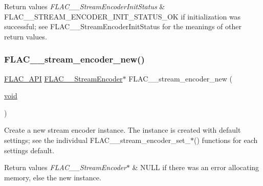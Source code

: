 \begin{DoxyRetVals}{Return values}
{\em F\+L\+A\+C\+\_\+\+\_\+\+Stream\+Encoder\+Init\+Status} & {\ttfamily F\+L\+A\+C\+\_\+\+\_\+\+S\+T\+R\+E\+A\+M\+\_\+\+E\+N\+C\+O\+D\+E\+R\+\_\+\+I\+N\+I\+T\+\_\+\+S\+T\+A\+T\+U\+S\+\_\+\+OK} if initialization was successful; see F\+L\+A\+C\+\_\+\+\_\+\+Stream\+Encoder\+Init\+Status for the meanings of other return values. \\
\hline
\end{DoxyRetVals}
\mbox{\label{group__flac__stream__encoder_ga35f3d94452bcf0a90a31c7d770b200bc}} 
\subsubsection{\texorpdfstring{FLAC\_\_stream\_encoder\_new()}{FLAC\_\_stream\_encoder\_new()}}
{\footnotesize\ttfamily \mbox{\hyperlink{group__flac__export_ga56ca07df8a23310707732b1c0007d6f5}{F\+L\+A\+C\+\_\+\+A\+PI}} \mbox{\hyperlink{struct_f_l_a_c_____stream_encoder}{F\+L\+A\+C\+\_\+\+\_\+\+Stream\+Encoder}}$\ast$ F\+L\+A\+C\+\_\+\+\_\+stream\+\_\+encoder\+\_\+new (\begin{DoxyParamCaption}\item[{\mbox{\hyperlink{_s_d_l__opengles2__gl2ext_8h_ae5d8fa23ad07c48bb609509eae494c95}{void}}}]{ }\end{DoxyParamCaption})}

Create a new stream encoder instance. The instance is created with default settings; see the individual F\+L\+A\+C\+\_\+\+\_\+stream\+\_\+encoder\+\_\+set\+\_\+$\ast$() functions for each setting\textquotesingle{}s default.


\begin{DoxyRetVals}{Return values}
{\em F\+L\+A\+C\+\_\+\+\_\+\+Stream\+Encoder$\ast$} & {\ttfamily N\+U\+LL} if there was an error allocating memory, else the new instance. \\
\hline
\end{DoxyRetVals}
\mbox{\label{group__flac__stream__encoder_gae187ec4f6cab3ca109637996ee23272d}} 

